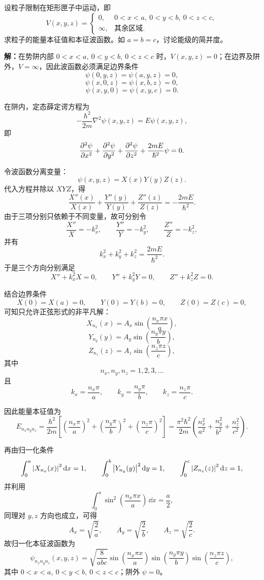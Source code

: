 \documentclass[10pt,a4paper]{article}
\begin{document}
\maketitle

\section{}
设粒子限制在矩形匣子中运动，即
\[
V(x,y,z)=
\begin{cases}
0, & 0<x<a,\ 0<y<b,\ 0<z<c,\\
\infty, & \text{其余区域}.
\end{cases}
\]
求粒子的能量本征值和本征波函数。如 $a=b=c$，讨论能级的简并度。

\vspace{0.5cm}

\noindent\textbf{解：}在势阱内部 $0<x<a,\ 0<y<b,\ 0<z<c$ 时，$V(x,y,z)=0$；在边界及阱外，$V=\infty$，因此波函数必须满足边界条件
\[
\psi(0,y,z)=\psi(a,y,z)=0,
\]
\[
\psi(x,0,z)=\psi(x,b,z)=0,
\]
\[
\psi(x,y,0)=\psi(x,y,c)=0.
\]

在阱内，定态薛定谔方程为
\[
-\frac{\hbar^2}{2m}\nabla^2\psi(x,y,z)=E\psi(x,y,z),
\]
即
\[
\pdv[2]{\psi}{x}+\pdv[2]{\psi}{y}+\pdv[2]{\psi}{z}+\frac{2mE}{\hbar^2}\psi=0.
\]

令波函数分离变量：
\[
\psi(x,y,z)=X(x)Y(y)Z(z).
\]
代入方程并除以 $XYZ$，得
\[
\frac{X''(x)}{X(x)}+\frac{Y''(y)}{Y(y)}+\frac{Z''(z)}{Z(z)}=-\frac{2mE}{\hbar^2}.
\]
由于三项分别只依赖于不同变量，故可分别令
\[
\frac{X''}{X}=-k_x^2,\qquad \frac{Y''}{Y}=-k_y^2,\qquad \frac{Z''}{Z}=-k_z^2,
\]
并有
\[
k_x^2+k_y^2+k_z^2=\frac{2mE}{\hbar^2}.
\]
于是三个方向分别满足
\[
X''+k_x^2X=0,\qquad Y''+k_y^2Y=0,\qquad Z''+k_z^2Z=0.
\]

结合边界条件
\[
X(0)=X(a)=0,\qquad Y(0)=Y(b)=0,\qquad Z(0)=Z(c)=0,
\]
可知只允许正弦形式的非平凡解：
\[
X_{n_x}(x)=A_x\sin\left(\frac{n_x\pi x}{a}\right),
\]
\[
Y_{n_y}(y)=A_y\sin\left(\frac{n_y\pi y}{b}\right),
\]
\[
Z_{n_z}(z)=A_z\sin\left(\frac{n_z\pi z}{c}\right),
\]
其中
\[
n_x,n_y,n_z=1,2,3,\dots
\]
且
\[
k_x=\frac{n_x\pi}{a},\qquad k_y=\frac{n_y\pi}{b},\qquad k_z=\frac{n_z\pi}{c}.
\]

因此能量本征值为
\[
E_{n_xn_yn_z}=\frac{\hbar^2}{2m}\left[\left(\frac{n_x\pi}{a}\right)^2+\left(\frac{n_y\pi}{b}\right)^2+\left(\frac{n_z\pi}{c}\right)^2\right]
=\frac{\pi^2\hbar^2}{2m}\left(\frac{n_x^2}{a^2}+\frac{n_y^2}{b^2}+\frac{n_z^2}{c^2}\right).
\]

再由归一化条件
\[
\int_0^a \abs{X_{n_x}(x)}^2\,\dd x=1,\qquad \int_0^b \abs{Y_{n_y}(y)}^2\,\dd y=1,\qquad \int_0^c \abs{Z_{n_z}(z)}^2\,\dd z=1,
\]
并利用
\[
\int_0^a \sin^2\left(\frac{n_x\pi x}{a}\right)\,\dd x=\frac{a}{2},
\]
同理对 $y,z$ 方向也成立，可得
\[
A_x=\sqrt{\frac{2}{a}},\qquad A_y=\sqrt{\frac{2}{b}},\qquad A_z=\sqrt{\frac{2}{c}}.
\]
故归一化本征波函数为
\[
\psi_{n_xn_yn_z}(x,y,z)=\sqrt{\frac{8}{abc}}\sin\left(\frac{n_x\pi x}{a}\right)\sin\left(\frac{n_y\pi y}{b}\right)\sin\left(\frac{n_z\pi z}{c}\right),
\]
其中 $0<x<a,\ 0<y<b,\ 0<z<c$；阱外 $\psi=0$。
\end{document}
